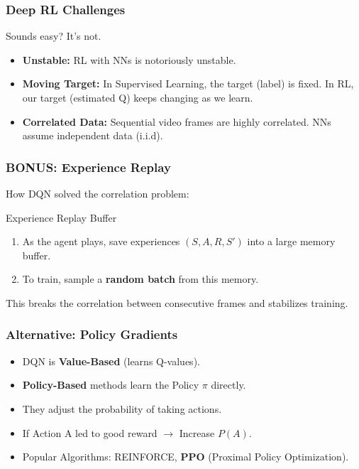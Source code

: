 \documentclass[aspectratio=169]{beamer}
\begin{document}
\begin{frame}
    \frametitle{Deep RL Challenges}
    Sounds easy? It's not.
    \begin{itemize}
        \item \textbf{Unstable:} RL with NNs is notoriously unstable.
        \item \textbf{Moving Target:} In Supervised Learning, the target (label) is fixed. In RL, our target (estimated Q) keeps changing as we learn.
        \item \textbf{Correlated Data:} Sequential video frames are highly correlated. NNs assume independent data (i.i.d).
    \end{itemize}
\end{frame}

\begin{frame}
    \frametitle{BONUS: Experience Replay}
    How DQN solved the correlation problem:
    \begin{block}{Experience Replay Buffer}
        \begin{enumerate}
            \item As the agent plays, save experiences $(S, A, R, S')$ into a large memory buffer.
            \item To train, sample a \textbf{random batch} from this memory.
        \end{enumerate}
    \end{block}
    This breaks the correlation between consecutive frames and stabilizes training.
\end{frame}

\begin{frame}
    \frametitle{Alternative: Policy Gradients}
    \begin{itemize}
        \item DQN is \textbf{Value-Based} (learns Q-values).
        \item \textbf{Policy-Based} methods learn the Policy $\pi$ directly.
        \item They adjust the probability of taking actions.
        \item If Action A led to good reward $\rightarrow$ Increase $P(A)$.
        \item Popular Algorithms: REINFORCE, \textbf{PPO} (Proximal Policy Optimization).
    \end{itemize}
\end{frame}
\end{document}
